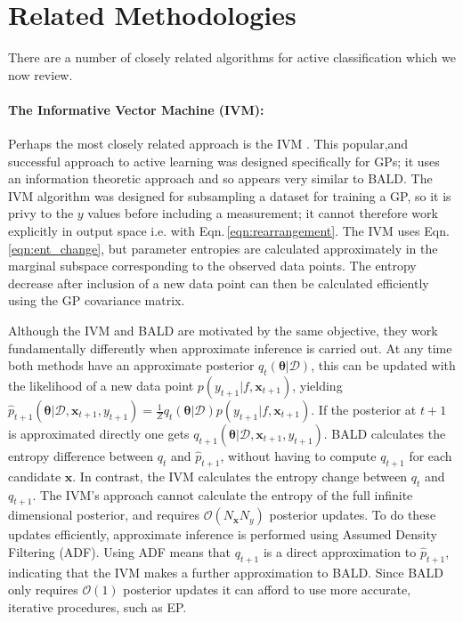 \documentclass[twoside]{article}
\newcommand{\x}{\bm{x}}
\newcommand{\y}{y}
\newcommand{\data}{\mathcal{D}}
\newcommand{\param}{\bm{\theta}}
\begin{document}
\section{Related Methodologies}

There are a number of closely related algorithms for active classification which we now review.

\paragraph{The Informative Vector Machine (IVM):} Perhaps the most closely related approach is the IVM \cite{lawrence2003}. This popular,and successful approach to active learning was designed specifically for GPs; it uses an information theoretic approach and so appears very similar to BALD. The IVM algorithm was designed for subsampling a dataset for training a GP, so it is privy to the $\y$ values before including a measurement; it cannot therefore work explicitly in output space i.e. with Eqn.\,\eqref{eqn:rearrangement}. The IVM uses Eqn.\,\eqref{eqn:ent_change}, but parameter entropies are calculated approximately in the marginal subspace corresponding to the observed data points. The entropy decrease after inclusion of a new data point can then be calculated efficiently using the GP covariance matrix.

Although the IVM and BALD are motivated by the same objective, they work fundamentally differently when approximate inference is carried out. At any time both methods have an approximate posterior $q_t(\param|\data)$, this can be updated with the likelihood of a new data point $p(y_{t+1}|f,\x_{t+1})$, yielding $\hat{p}_{t+1}(\param|\data,\x_{t+1}, y_{t+1})=\frac{1}{Z}q_t(\param|\data)p(y_{t+1}|f,\x_{t+1})$. If the posterior at $t+1$ is approximated directly one gets $q_{t+1}(\param|\data,\x_{t+1},\y_{t+1})$. BALD calculates the entropy difference between $q_t$ and $\hat{p}_{t+1}$, without having to compute $q_{t+1}$ for each candidate $\x$. In contrast, the IVM calculates the entropy change between $q_{t}$ and $q_{t+1}$. The IVM's approach cannot calculate the entropy of the full infinite dimensional posterior, and requires $\mathcal{O}(N_{\x}N_{\y})$ posterior updates. To do these updates efficiently, approximate inference is performed using Assumed Density Filtering (ADF). Using ADF means that $q_{t+1}$ is a direct approximation to $\hat{p}_{t+1}$, indicating that the IVM makes a further approximation to BALD. Since BALD only requires $\mathcal{O}(1)$ posterior updates it can afford to use more accurate, iterative procedures, such as EP.
\end{document}
